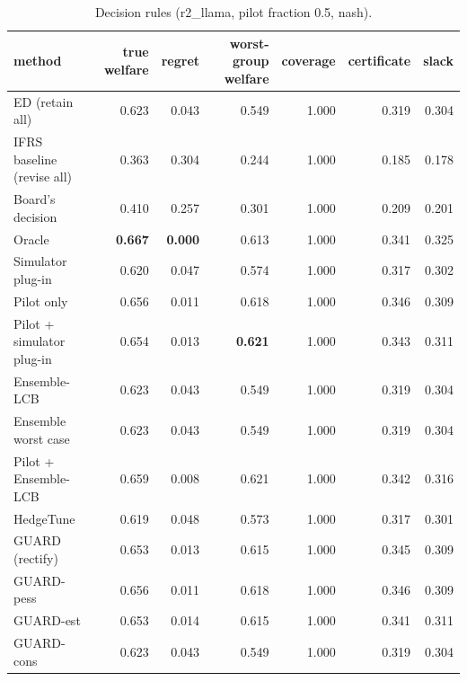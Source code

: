 \begin{table}[t]
\centering
\small
\begin{tabular}{lrrrrrr}
\toprule
method & true welfare & regret & worst-group welfare & coverage & certificate & slack \\
\midrule
ED (retain all) & 0.623 & 0.043 & 0.549 & 1.000 & 0.319 & 0.304 \\
IFRS baseline (revise all) & 0.363 & 0.304 & 0.244 & 1.000 & 0.185 & 0.178 \\
Board's decision & 0.410 & 0.257 & 0.301 & 1.000 & 0.209 & 0.201 \\
Oracle & \textbf{0.667} & \textbf{0.000} & 0.613 & 1.000 & 0.341 & 0.325 \\
Simulator plug-in & 0.620 & 0.047 & 0.574 & 1.000 & 0.317 & 0.302 \\
Pilot only & 0.656 & 0.011 & 0.618 & 1.000 & 0.346 & 0.309 \\
Pilot + simulator plug-in & 0.654 & 0.013 & \textbf{0.621} & 1.000 & 0.343 & 0.311 \\
Ensemble-LCB & 0.623 & 0.043 & 0.549 & 1.000 & 0.319 & 0.304 \\
Ensemble worst case & 0.623 & 0.043 & 0.549 & 1.000 & 0.319 & 0.304 \\
Pilot + Ensemble-LCB & 0.659 & 0.008 & 0.621 & 1.000 & 0.342 & 0.316 \\
HedgeTune & 0.619 & 0.048 & 0.573 & 1.000 & 0.317 & 0.301 \\
GUARD (rectify) & 0.653 & 0.013 & 0.615 & 1.000 & 0.345 & 0.309 \\
GUARD-pess & 0.656 & 0.011 & 0.618 & 1.000 & 0.346 & 0.309 \\
GUARD-est & 0.653 & 0.014 & 0.615 & 1.000 & 0.341 & 0.311 \\
GUARD-cons & 0.623 & 0.043 & 0.549 & 1.000 & 0.319 & 0.304 \\
\bottomrule
\end{tabular}
\caption{Decision rules (r2\_llama, pilot fraction 0.5, nash).}
\label{tab:methods-nash}
\end{table}
